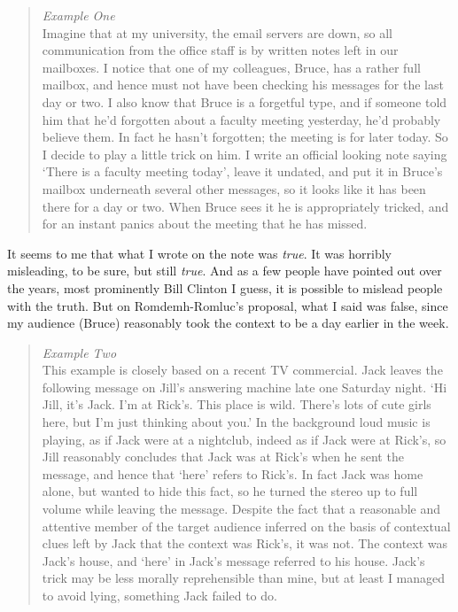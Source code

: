 \documentclass[
  11pt,
  letterpaper,
  DIV=11,
  numbers=noendperiod,
  twoside]{scrartcl}
\begin{document}
\begin{quote}
\emph{Example One}\\
Imagine that at my university, the email servers are down, so all
communication from the office staff is by written notes left in our
mailboxes. I notice that one of my colleagues, Bruce, has a rather full
mailbox, and hence must not have been checking his messages for the last
day or two. I also know that Bruce is a forgetful type, and if someone
told him that he'd forgotten about a faculty meeting yesterday, he'd
probably believe them. In fact he hasn't forgotten; the meeting is for
later today. So I decide to play a little trick on him. I write an
official looking note saying `There is a faculty meeting today', leave
it undated, and put it in Bruce's mailbox underneath several other
messages, so it looks like it has been there for a day or two. When
Bruce sees it he is appropriately tricked, and for an instant panics
about the meeting that he has missed.
\end{quote}

It seems to me that what I wrote on the note was \emph{true}. It was
horribly misleading, to be sure, but still \emph{true}. And as a few
people have pointed out over the years, most prominently Bill Clinton I
guess, it is possible to mislead people with the truth. But on
Romdemh-Romluc's proposal, what I said was false, since my audience
(Bruce) reasonably took the context to be a day earlier in the week.

\begin{quote}
\emph{Example Two}\\
This example is closely based on a recent TV commercial. Jack leaves the
following message on Jill's answering machine late one Saturday night.
`Hi Jill, it's Jack. I'm at Rick's. This place is wild. There's lots of
cute girls here, but I'm just thinking about you.' In the background
loud music is playing, as if Jack were at a nightclub, indeed as if Jack
were at Rick's, so Jill reasonably concludes that Jack was at Rick's
when he sent the message, and hence that `here' refers to Rick's. In
fact Jack was home alone, but wanted to hide this fact, so he turned the
stereo up to full volume while leaving the message. Despite the fact
that a reasonable and attentive member of the target audience inferred
on the basis of contextual clues left by Jack that the context was
Rick's, it was not. The context was Jack's house, and `here' in Jack's
message referred to his house. Jack's trick may be less morally
reprehensible than mine, but at least I managed to avoid lying,
something Jack failed to do.
\end{quote}
\end{document}
